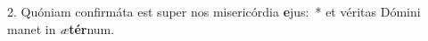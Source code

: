 2. Quóniam confirmáta est super nos misericórdia \textbf{e}jus:~*  et véritas Dómini manet in \textit{æ}\textbf{tér}num.\

